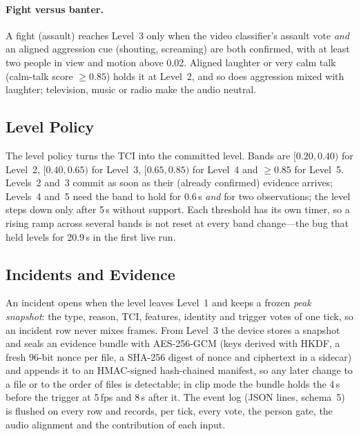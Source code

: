 \paragraph{Fight versus banter.} A fight (assault) reaches Level~3 only when the video classifier's assault vote \emph{and} an aligned aggression cue (shouting, screaming) are both confirmed, with at least two people in view and motion above 0.02. Aligned laughter or very calm talk (calm-talk score $\geq 0.85$) holds it at Level~2, and so does aggression mixed with laughter; television, music or radio make the audio neutral.

\subsection{Level Policy}
The level policy turns the TCI into the committed level. Bands are $[0.20, 0.40)$ for Level~2, $[0.40, 0.65)$ for Level~3, $[0.65, 0.85)$ for Level~4 and $\geq 0.85$ for Level~5. Levels~2 and~3 commit as soon as their (already confirmed) evidence arrives; Levels~4 and~5 need the band to hold for 0.6\,s \emph{and} for two observations; the level steps down only after 5\,s without support. Each threshold has its own timer, so a rising ramp across several bands is not reset at every band change---the bug that held levels for 20.9\,s in the first live run.

\subsection{Incidents and Evidence}
An incident opens when the level leaves Level~1 and keeps a frozen \emph{peak snapshot}: the type, reason, TCI, features, identity and trigger votes of one tick, so an incident row never mixes frames. From Level~3 the device stores a snapshot and seals an evidence bundle with AES-256-GCM \cite{nist80038d} (keys derived with HKDF, a fresh 96-bit nonce per file, a SHA-256 digest of nonce and ciphertext in a sidecar) and appends it to an HMAC-signed hash-chained manifest, so any later change to a file or to the order of files is detectable; in clip mode the bundle holds the 4\,s before the trigger at 5\,fps and 8\,s after it. The event log (JSON lines, schema~5) is flushed on every row and records, per tick, every vote, the person gate, the audio alignment and the contribution of each input.

